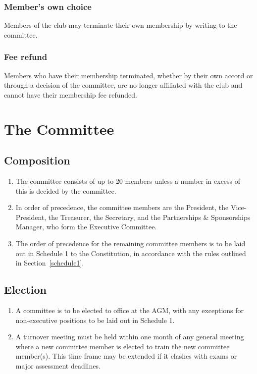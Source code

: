 \documentclass{constitution}
\begin{document}
\subsubsection{Member's own choice}
Members of the club may terminate their own membership by writing to the committee.

\subsubsection{Fee refund}
Members who have their membership terminated, whether by their own accord or through a decision of the committee, are no longer affiliated with the club and cannot have their membership fee refunded.


\section{The Committee}\label{theCommittee}

\subsection{Composition}\label{committeeComp}
\begin{enumerate}[(1)]
    \item The committee consists of up to 20 members unless a number in excess of this is decided by the committee.
    \item In order of precedence, the committee members are the President, the Vice-President, the Treasurer, the Secretary, and the Partnerships \& Sponsorships Manager, who form the Executive Committee.
    \item The order of precedence for the remaining committee members is to be laid out in Schedule 1 to the Constitution, in accordance with the rules outlined in Section~\ref{schedule1}.
\end{enumerate}

\subsection{Election}
\begin{enumerate}[(1)]
    \item A committee is to be elected to office at the AGM, with any exceptions for non-executive positions to be laid out in Schedule 1.
    \item A turnover meeting must be held within one month of any general meeting where a new committee member is elected to train the new committee member(s). This time frame may be extended if it clashes with exams or major assessment deadlines.
\end{enumerate}
\end{document}
